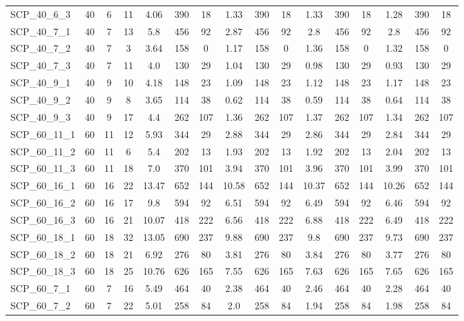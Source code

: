 \begin{sidewaystable}[!ht]
{\begin{tabular}{lccccccccccccccc}
SCP\_40\_6\_3 & 40 & 6 & 11 & 4.06 & 390 & 18 & 1.33 & 390 & 18 & 1.33 & 390 & 18 &  \textcolor{blue2}{1.28} & 390 & 18 \\
SCP\_40\_7\_1 & 40 & 7 & 13 & 5.8 & 456 & 92 & 2.87 & 456 & 92 & 2.8 & 456 & 92 & 2.8 & 456 & 92 \\
SCP\_40\_7\_2 & 40 & 7 & 3 & 3.64 & 158 & 0 &  \textcolor{blue2}{1.17} & 158 & 0 & 1.36 & 158 & 0 & 1.32 & 158 & 0 \\
SCP\_40\_7\_3 & 40 & 7 & 11 & 4.0 & 130 & 29 & 1.04 & 130 & 29 & 0.98 & 130 & 29 &  \textcolor{blue2}{0.93} & 130 & 29 \\
SCP\_40\_9\_1 & 40 & 9 & 10 & 4.18 & 148 & 23 & 1.09 & 148 & 23 & 1.12 & 148 & 23 & 1.17 & 148 & 23 \\
SCP\_40\_9\_2 & 40 & 9 & 8 & 3.65 & 114 & 38 & 0.62 & 114 & 38 & 0.59 & 114 & 38 & 0.64 & 114 & 38 \\
SCP\_40\_9\_3 & 40 & 9 & 17 & 4.4 & 262 & 107 & 1.36 & 262 & 107 & 1.37 & 262 & 107 & 1.34 & 262 & 107 \\
SCP\_60\_11\_1 & 60 & 11 & 12 & 5.93 & 344 & 29 & 2.88 & 344 & 29 & 2.86 & 344 & 29 & 2.84 & 344 & 29 \\
SCP\_60\_11\_2 & 60 & 11 & 6 & 5.4 & 202 & 13 & 1.93 & 202 & 13 &  \textcolor{blue2}{1.92} & 202 & 13 & 2.04 & 202 & 13 \\
SCP\_60\_11\_3 & 60 & 11 & 18 & 7.0 & 370 & 101 & 3.94 & 370 & 101 & 3.96 & 370 & 101 & 3.99 & 370 & 101 \\
SCP\_60\_16\_1 & 60 & 16 & 22 & 13.47 & 652 & 144 & 10.58 & 652 & 144 & 10.37 & 652 & 144 & 10.26 & 652 & 144 \\
SCP\_60\_16\_2 & 60 & 16 & 17 & 9.8 & 594 & 92 & 6.51 & 594 & 92 & 6.49 & 594 & 92 & 6.46 & 594 & 92 \\
SCP\_60\_16\_3 & 60 & 16 & 21 & 10.07 & 418 & 222 & 6.56 & 418 & 222 & 6.88 & 418 & 222 &  \textcolor{blue2}{6.49} & 418 & 222 \\
SCP\_60\_18\_1 & 60 & 18 & 32 & 13.05 & 690 & 237 & 9.88 & 690 & 237 & 9.8 & 690 & 237 & 9.73 & 690 & 237 \\
SCP\_60\_18\_2 & 60 & 18 & 21 & 6.92 & 276 & 80 & 3.81 & 276 & 80 & 3.84 & 276 & 80 & 3.77 & 276 & 80 \\
SCP\_60\_18\_3 & 60 & 18 & 25 & 10.76 & 626 & 165 & 7.55 & 626 & 165 & 7.63 & 626 & 165 & 7.65 & 626 & 165 \\
SCP\_60\_7\_1 & 60 & 7 & 16 & 5.49 & 464 & 40 & 2.38 & 464 & 40 & 2.46 & 464 & 40 & 2.28 & 464 & 40 \\
SCP\_60\_7\_2 & 60 & 7 & 22 & 5.01 & 258 & 84 & 2.0 & 258 & 84 &  \textcolor{blue2}{1.94} & 258 & 84 & 1.98 & 258 & 84 \\

\end{tabular}}
\end{sidewaystable}
